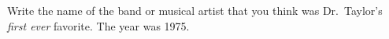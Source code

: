 \showpoints

\bonusquestion[2]
Write the name of the band or musical artist that you think was Dr.~Taylor's \emph{first ever} favorite. The year was 1975.

